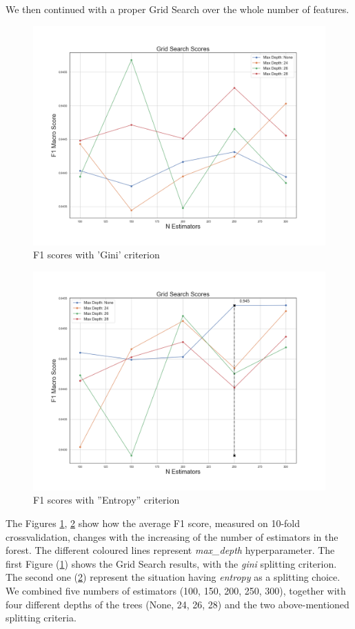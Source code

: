 We then continued with a proper Grid Search over the whole number of features.
\begin{figure}[htp!]
	\centering
	\includegraphics[width=\columnwidth]{chapter5/figure/gini.png}
	\caption{F1 scores with 'Gini' criterion}
	\label{fig:gini}
\end{figure}
\begin{figure}[htp!]
	\centering
	\includegraphics[width=\columnwidth]{chapter5/figure/entropy.png}
	\caption{F1 scores with ''Entropy'' criterion}
	\label{fig:entropy}
\end{figure}

The Figures \ref{fig:gini}, \ref{fig:entropy} show how the average F1 score, measured on 10-fold crossvalidation, changes with the increasing of the number of estimators in the forest.
The different coloured lines represent \textit{max\_depth} hyperparameter.
The first Figure (\ref{fig:gini}) shows the Grid Search results, with the \textit{gini} splitting criterion.
The second one (\ref{fig:entropy}) represent the situation having \textit{entropy} as a splitting choice.
We combined five numbers of estimators (100, 150, 200, 250, 300), together with four different depths of the trees (None, 24, 26, 28) and the two above-mentioned splitting criteria.

